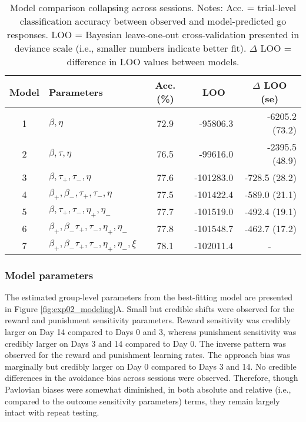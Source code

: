 \documentclass[a4paper,12pt]{article}
\begin{document}
\begin{refsection}[main]
\begin{table}[b!]
    \centering
    \begin{tabular}{clcrr}
        \toprule
        Model & Parameters & Acc. (\%) & \multicolumn{1}{c}{LOO} & \multicolumn{1}{c}{$\Delta$ LOO (se)} \\
        \midrule
        1 & $\beta, \eta$ & 72.9 & -95806.3 & -6205.2 (73.2) \\
        2 & $\beta, \tau, \eta$ & 76.5 & -99616.0 & -2395.5 (48.9) \\
        3 & $\beta, \tau_+, \tau_-, \eta$ & 77.6 & -101283.0 & -728.5 (28.2) \\
        4 & $\beta_+, \beta_-, \tau_+, \tau_-, \eta$ & 77.5 & -101422.4 & -589.0 (21.1) \\
        5 & $\beta, \tau_+, \tau_-, \eta_+, \eta_-$ & 77.7 & -101519.0 & -492.4 (19.1) \\
        6 & $\beta_+, \beta_- \tau_+, \tau_-, \eta_+, \eta_-$ & 77.8 & -101548.7 & -462.7 (17.2) \\
        7 & $\beta_+, \beta_- \tau_+, \tau_-, \eta_+, \eta_-, \xi$ & 78.1 & -102011.4 & \multicolumn{1}{c}{-} \\
        \bottomrule
\end{tabular}
    \caption{Model comparison collapsing across sessions. Notes: Acc. = trial-level classification accuracy between observed and model-predicted go responses. LOO = Bayesian leave-one-out cross-validation presented in deviance scale (i.e., smaller numbers indicate better fit). $\Delta$ LOO = difference in LOO values between models.}
    \label{tab:exp2_mc_abbr}
\end{table}

\subsubsection*{Model parameters}

The estimated group-level parameters from the best-fitting model are presented in Figure \ref{fig:exp02_modeling}A. Small but credible shifts were observed for the reward and punishment sensitivity parameters. Reward sensitivity was credibly larger on Day 14 compared to Days 0 and 3, whereas punishment sensitivity was credibly larger on Days 3 and 14 compared to Day 0. The inverse pattern was observed for the reward and punishment learning rates. The approach bias was marginally but credibly larger on Day 0 compared to Days 3 and 14. No credible differences in the avoidance bias across sessions were observed. Therefore, though Pavlovian biases were somewhat diminished, in both absolute and relative (i.e., compared to the outcome sensitivity parameters) terms, they remain largely intact with repeat testing.   


\end{refsection}
\end{document}
